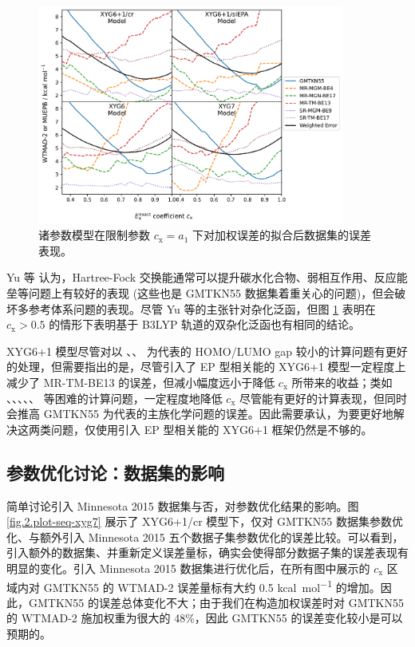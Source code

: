\begin{figure}[h]
  \centering
  \includegraphics[width=0.9\textwidth]{assets/plot-seq.pdf}
  \caption[诸参数模型在限制 $E_\mathrm{x}^\textmt{exact}$ 系数下参数优化后误差]{诸参数模型在限制参数 $c_\mathrm{x} = a_1$ 下对加权误差的拟合后数据集的误差表现。}
  \label{fig.2.plot-seq}
\end{figure}

Yu 等\cite{Yu-Truhlar.CS.2016} 认为，Hartree-Fock 交换能通常可以提升碳水化合物、弱相互作用、反应能垒等问题上有较好的表现 (这些也是 GMTKN55 数据集着重关心的问题)，但会破坏多参考体系问题的表现。尽管 Yu 等的主张针对杂化泛函，但图 \ref{fig.2.plot-seq} 表明在 $c_\mathrm{x} > 0.5$ 的情形下表明基于 B3LYP 轨道的双杂化泛函也有相同的结论。

XYG6+1 模型尽管对以 、、 为代表的 HOMO/LUMO gap 较小的计算问题有更好的处理，但需要指出的是，尽管引入了 EP 型相关能的 XYG6+1 模型一定程度上减少了 MR-TM-BE13 的误差，但减小幅度远小于降低 $c_\mathrm{x}$ 所带来的收益；类如 、、、、、 等困难的计算问题，一定程度地降低 $c_\mathrm{x}$ 尽管能有更好的计算表现，但同时会推高 GMTKN55 为代表的主族化学问题的误差。因此需要承认，为要更好地解决这两类问题，仅使用引入 EP 型相关能的 XYG6+1 框架仍然是不够的。

\subsection{参数优化讨论：数据集的影响}
\label{sec.2.propotion-dataset}

简单讨论引入 Minnesota 2015 数据集与否，对参数优化结果的影响。图 \ref{fig.2.plot-seq-xyg7} 展示了 XYG6+1/cr 模型下，仅对 GMTKN55 数据集参数优化、与额外引入 Minnesota 2015 五个数据子集参数优化的误差比较。可以看到，引入额外的数据集、并重新定义误差量标，确实会使得部分数据子集的误差表现有明显的变化。引入 Minnesota 2015 数据集进行优化后，在所有图中展示的 $c_\mathrm{x}$ 区域内对 GMTKN55 的 WTMAD-2 误差量标有大约 0.5 \si{kcal.mol^{-1}} 的增加。因此，GMTKN55 的误差总体变化不大；由于我们在构造加权误差时对 GMTKN55 的 WTMAD-2 施加权重为很大的 48\%，因此 GMTKN55 的误差变化较小是可以预期的。

